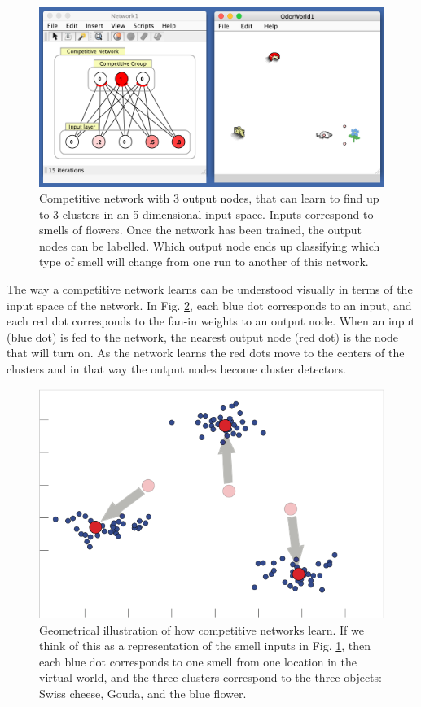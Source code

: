 \begin{figure}[h]
\centering
\includegraphics[scale=.4]{./images/competitive_3.png}
\caption[Simbrain screenshot]{Competitive network with 3 output nodes, that can learn to find up to 3 clusters in an 5-dimensional input space. Inputs correspond to smells of flowers. Once the network has been trained, the output nodes can be labelled. Which output node ends up classifying which type of smell will change from one run to another of this network.}
\label{competitive_3}
\end{figure}

The way a competitive network learns can be understood visually in terms of the input space of the network. In Fig. \ref{competitiveInputSpace}, each blue dot corresponds to an input, and each red dot corresponds to the fan-in weights to an output node. When an input (blue dot) is fed to the network, the nearest output node (red dot) is the node that will turn on. As the network learns the red dots move to the centers of the clusters and in that way the output nodes become cluster detectors. 

\begin{figure}[h]
\centering
\includegraphics[scale=1]{./images/competitiveInputSpace.png}
\caption[Pamela Payne.]{Geometrical illustration of how competitive networks learn. If we think of this as a representation of the smell inputs in Fig. \ref{competitive_3}, then each blue dot corresponds to one smell from one location in the virtual world, and the three clusters correspond to the three objects: Swiss cheese, Gouda, and the blue flower. }
\label{competitiveInputSpace}
\end{figure}

